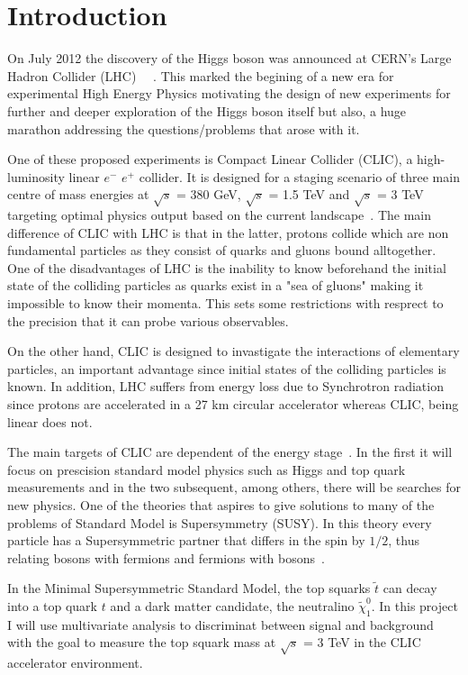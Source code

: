 \documentclass[12pt,a4paper]{report}
\begin{document}
\chapter{Introduction}

On July 2012 the discovery of the Higgs boson was announced at CERN's Large Hadron Collider (LHC)~\cite{aad2012observation}
~\cite{higgs1966spontaneous}. 
This marked the begining of a new era for experimental High Energy Physics motivating the design of new 
experiments for further and deeper exploration of the Higgs boson itself but also, a huge marathon
addressing the questions/problems that arose with it. 

One of these proposed experiments is Compact Linear Collider (CLIC), a high-luminosity linear $e^{-}$ $e^{+}$ collider. It is designed for a staging scenario of three main centre of mass energies at $\surd{s}$ = 380 GeV, $\surd{s}$ = 1.5 TeV
and $\surd{s}$ = 3 TeV targeting optimal physics output based on the current landscape~\cite{clic2016updated}. 
The main difference of CLIC with LHC is that in the latter, protons collide which are non fundamental particles as they consist of quarks and 
gluons bound alltogether. One of the disadvantages of LHC is the inability to know beforehand the initial state of the colliding particles as quarks exist in a "sea of gluons" making it impossible to know their momenta. This sets
some restrictions with resprect to the precision that it can probe various observables.

On the other hand, CLIC is designed to invastigate the interactions of elementary particles, an important advantage since initial states of the colliding particles is known. In addition, LHC suffers from energy loss due to 
Synchrotron radiation since protons are accelerated in a 27 km circular accelerator whereas CLIC, being linear does not.

The main targets of CLIC are dependent of the energy stage~\cite{clic2016updated}.
In the first it will focus on prescision standard model physics such as Higgs and top quark measurements and in the two subsequent, among others, there will be searches
for new physics. One of the theories that aspires to give solutions to many of the problems of Standard Model is Supersymmetry (SUSY). In this theory every particle has a Supersymmetric partner that differs in the spin by $1/2$, thus 
relating bosons with fermions and fermions with bosons~\cite{bilal2001introduction}.

In the Minimal Supersymmetric Standard Model, the top squarks $\tilde{t}$ can decay into a top quark $t$
and a dark matter candidate, the neutralino $\tilde{\chi}_{1}^{0}$. In this project I will use multivariate analysis
to discriminat between signal and background with the goal to measure the top squark
mass at $\surd{s}$ = 3 TeV in the CLIC accelerator environment.
\end{document}
